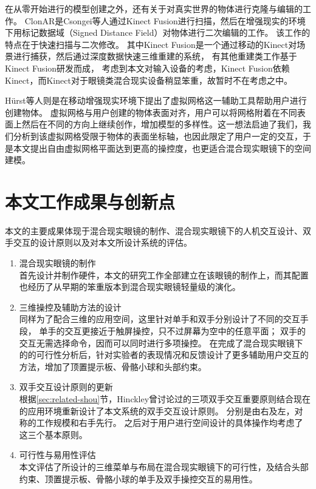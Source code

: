 在从零开始进行的模型创建之外，还有关于对真实世界的物体进行克隆与编辑的工作。
ClonAR是Csongei等人通过Kinect Fusion进行扫描，然后在增强现实的环境下用标记数据域（Signed Distance Field）对物体进行二次编辑的工作。
该工作的特点在于快速扫描与二次修改。
其中Kinect Fusion是一个通过移动的Kinect对场景进行捕获，然后通过深度数据快速三维重建的系统，
有其他重建类工作基于Kinect Fusion研发而成，
考虑到本文对输入设备的考虑，Kinect Fusion依赖Kinect，而Kinect对于眼镜类混合现实设备稍显笨重，故暂时不在考虑之中。

H{\"u}rst等人则是在移动增强现实环境下提出了虚拟网格这一辅助工具帮助用户进行创建物体。
虚拟网格与用户创建的物体表面对齐，用户可以将网格附着在不同表面上然后在不同的方向上继续创作，增加模型的多样性。这一想法启迪了我们，我们分析到该虚拟网格受限于物体的表面坐标轴，也因此限定了用户一定的交互，于是本文提出自由虚拟网格平面达到更高的操控度，也更适合混合现实眼镜下的空间建模。

\section{本文工作成果与创新点}
本文的主要成果体现于混合现实眼镜的制作、混合现实眼镜下的人机交互设计、双手交互的设计原则以及对本文所设计系统的评估。
\begin{enumerate}
\item 混合现实眼镜的制作\hfill\\
首先设计并制作硬件，本文的研究工作全部建立在该眼镜的制作上，而其配置也经历了从早期的笨重版本到混合现实眼镜轻量级的演化。
\item 三维操控及辅助方法的设计\hfill\\
同样为了配合三维的应用空间，这里针对单手和双手分别设计了不同的交互手段，
单手的交互更接近于触屏操控，只不过屏幕为空中的任意平面；
双手的交互无需选择命令，因而可以同时进行多项操控。
在完成了混合现实眼镜下的的可行性分析后，针对实验者的表现情况和反馈设计了更多辅助用户交互的方法，增加了顶置提示板、骨骼小球和头部约束。
\item 双手交互设计原则的更新\hfill\\
根据\ref{sec:related-shou}节，Hinckley曾讨论过的三项双手交互重要原则结合现在的应用环境重新设计了本文系统的双手交互设计原则。
分别是由右及左，对称的工作规模和右手先行。
之后对于用户进行空间设计的具体操作均考虑了这三个基本原则。
\item 可行性与易用性评估\hfill\\
本文评估了所设计的三维菜单与布局在混合现实眼镜下的可行性，及结合头部约束、顶置提示板、骨骼小球的单手及双手操控交互的易用性。
\end{enumerate}

